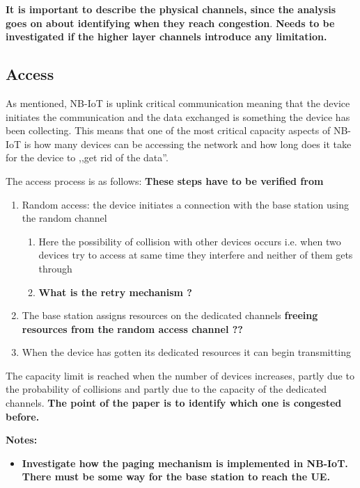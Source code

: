 \documentclass[10pt,a4paper,titlepage,twoside]{article}
\newcommand{\hghlght}[1]{\textbf{\color{ymaorng} #1}}
\newcommand{\point}[1]{\textbf{\color{ymared} #1}}
\begin{document}
\hghlght{It is important to describe the physical channels, since the analysis goes on about identifying when they reach congestion}. \point{Needs to be investigated if the higher layer channels introduce any limitation.}

\subsection{Access}

As mentioned, NB-IoT is uplink critical communication meaning that the device initiates the communication and the data exchanged is something the device has been collecting. This means that one of the most critical capacity aspects of NB-IoT is how many devices can be accessing the network and how long does it take for the device to ,,get rid of the data''.

The access process is as follows: \hghlght{These steps have to be verified from \cite{3gpp}}
\begin{enumerate}
  \item Random access: the device initiates a connection with the base station using the random channel
  \begin{enumerate}
    \item Here the possibility of collision with other devices occurs i.e. when two devices try to access at same time they interfere and neither of them gets through
    \item \hghlght{What is the retry mechanism ?}
  \end{enumerate}
  \item The base station assigns resources on the dedicated channels \point{freeing resources from the random access channel ??}
  \item When the device has gotten its dedicated resources it can begin transmitting
\end{enumerate}

The capacity limit is reached when the number of devices increases, partly due to the probability of collisions and partly due to the capacity of the dedicated channels. \hghlght{The point of the paper is to identify which one is congested before.}

\point{Notes:}\vspace{-4mm}
\begin{itemize}
  \item \hghlght{Investigate how the paging mechanism is implemented in NB-IoT. There must be some way for the base station to reach the UE.}
\end{itemize}
\end{document}
